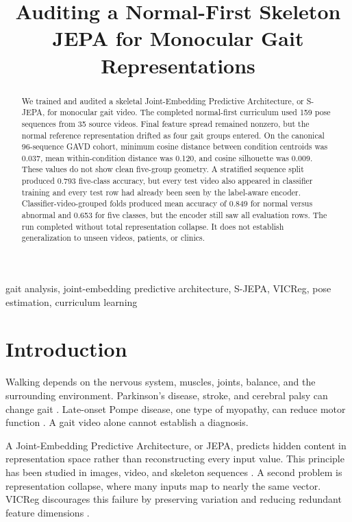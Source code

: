 \documentclass[conference]{IEEEtran}
\title{Auditing a Normal-First Skeleton JEPA for Monocular Gait Representations}
\author{
\IEEEauthorblockN{Alex Mui, Penny Inouye, Theodore Mui, and Phil Mui}
\IEEEauthorblockA{\textit{Aspiring Scholars Directed Research Program (ASDRP)}\\
\texttt{alexander.mui@students.asdrp.org} \quad \texttt{pennypenelopesf@gmail.com}\\
\texttt{theodoremui@gmail.com} \quad \texttt{phil.mui@asdrp.org}}
}
\begin{document}
\maketitle

\begin{abstract}
We trained and audited a skeletal Joint-Embedding Predictive Architecture, or S-JEPA, for monocular gait video. The completed normal-first curriculum used 159 pose sequences from 35 source videos. Final feature spread remained nonzero, but the normal reference representation drifted as four gait groups entered. On the canonical 96-sequence GAVD cohort, minimum cosine distance between condition centroids was 0.037, mean within-condition distance was 0.120, and cosine silhouette was 0.009. These values do not show clean five-group geometry. A stratified sequence split produced 0.793 five-class accuracy, but every test video also appeared in classifier training and every test row had already been seen by the label-aware encoder. Classifier-video-grouped folds produced mean accuracy of 0.849 for normal versus abnormal and 0.653 for five classes, but the encoder still saw all evaluation rows. The run completed without total representation collapse. It does not establish generalization to unseen videos, patients, or clinics.
\end{abstract}

\begin{IEEEkeywords}
gait analysis, joint-embedding predictive architecture, S-JEPA, VICReg, pose estimation, curriculum learning
\end{IEEEkeywords}

\section{Introduction}
Walking depends on the nervous system, muscles, joints, balance, and the surrounding environment. Parkinson's disease, stroke, and cerebral palsy can change gait \cite{zanardi2021parkinsons,lauziere2014stroke,pandey2023crouch}. Late-onset Pompe disease, one type of myopathy, can reduce motor function \cite{maulet2023myopathy}. A gait video alone cannot establish a diagnosis.

A Joint-Embedding Predictive Architecture, or JEPA, predicts hidden content in representation space rather than reconstructing every input value. This principle has been studied in images, video, and skeleton sequences \cite{assran2023ijepa,bardes2024vjepa,abdelfattah2024sjepa}. A second problem is representation collapse, where many inputs map to nearly the same vector. VICReg discourages this failure by preserving variation and reducing redundant feature dimensions \cite{bardes2022vicreg}.
\end{document}

